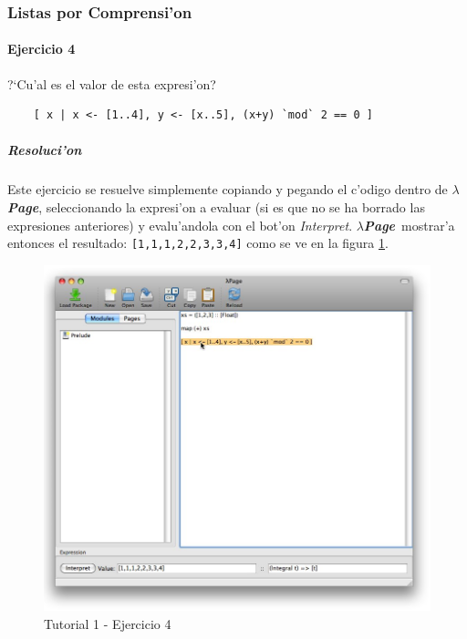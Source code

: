 \documentclass[a4paper]{article}
\newcommand{\hpage}{\textbf{\textsl{$\lambda$Page}}}
\begin{document}
\subsubsection{Listas por Comprensi'on}
\paragraph{Ejercicio 4}?`Cu'al es el valor de esta expresi'on?
\lstset{language=haskell, frame=single, tabsize=4}
\begin{lstlisting}
	[ x | x <- [1..4], y <- [x..5], (x+y) `mod` 2 == 0 ]
\end{lstlisting}
\subparagraph{Resoluci'on}Este ejercicio se resuelve simplemente copiando y pegando el c'odigo dentro de \hpage, seleccionando la expresi'on a evaluar (si es que no se ha borrado las expresiones anteriores) y evalu'andola con el bot'on \textsl{Interpret}.  \hpage\ mostrar'a entonces el resultado: \texttt{[1,1,1,2,2,3,3,4]} como se ve en la figura \ref{tut102}.
\begin{figure}[hp]
	\begin{center}
        	\includegraphics[width=.9\textwidth]{pictures/tut1/02}
		\caption{Tutorial 1 - Ejercicio 4}
		\label{tut102}
	\end{center}
\end{figure}
\end{document}
